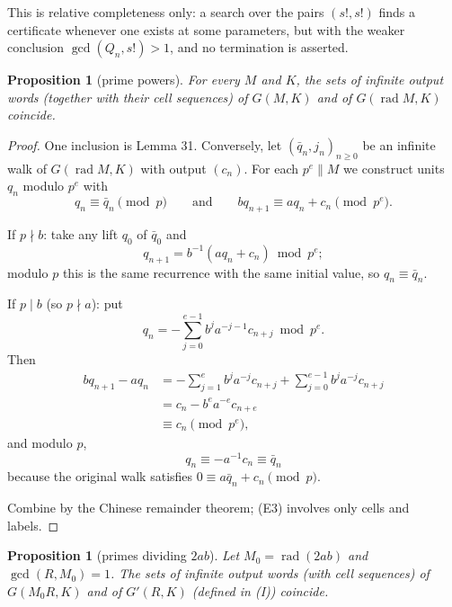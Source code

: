 \documentclass[11pt,reqno]{amsart}
\newtheorem{proposition}[theorem]{Proposition}
\theoremstyle{definition}
\theoremstyle{remark}
\begin{document}
This is relative completeness only: a search over the pairs \((s!,s!)\)
finds a certificate whenever one exists at some parameters, but with the
weaker conclusion \(\gcd(Q_n,s!)>1\), and no termination is asserted.

\begin{samepage}
\begin{proposition}[prime powers]\leavevmode\label{thm:35}
For every \(M\) and \(K\), the sets
of infinite output words (together with their cell sequences) of
\(G(M,K)\) and of \(G(\operatorname{rad}M,K)\) coincide.
\label{thm-end:35}
\end{proposition}
\end{samepage}

\begin{proof}\leavevmode\label{proof:35}
One inclusion is Lemma 31. Conversely, let
\((\bar q_n,j_n)_{n\ge0}\) be an infinite walk of
\(G(\operatorname{rad}M,K)\) with output \((c_n)\). For each
\(p^e\parallel M\) we construct units \(q_n\) modulo \(p^e\) with
\[
q_n\equiv\bar q_n\pmod p\qquad \text{and}\qquad bq_{n+1}\equiv aq_n+c_n\pmod{p^e}.
\]

If \(p\nmid b\): take any lift \(q_0\) of \(\bar q_0\) and
\[
q_{n+1}=b^{-1}(aq_n+c_n)\bmod p^e;
\]
modulo \(p\) this is the same
recurrence with the same initial value, so \(q_n\equiv\bar q_n\).

If
\(p\mid b\) (so \(p\nmid a\)): put
\[
q_n=-\sum_{j=0}^{e-1}b^ja^{-j-1}c_{n+j}\bmod p^e.
\]
Then
\[
\begin{aligned}
bq_{n+1}-aq_n&=-\sum_{j=1}^{e}b^ja^{-j}c_{n+j}+\sum_{j=0}^{e-1}b^ja^{-j}c_{n+j}\\
&=c_n-b^ea^{-e}c_{n+e}\\
&\equiv c_n\pmod{p^e},
\end{aligned}
\]
and modulo \(p\),
\[
q_n\equiv-a^{-1}c_n\equiv\bar q_n
\]
because the original walk satisfies
\(0\equiv a\bar q_n+c_n\pmod p\).

Combine by the Chinese remainder
theorem; (E3) involves only cells and labels. \qedhere
\end{proof}

\begin{samepage}
\begin{proposition}[primes dividing \(2ab\)]\leavevmode\label{thm:36}
Let
\(M_0=\operatorname{rad}(2ab)\) and \(\gcd(R,M_0)=1\). The sets of
infinite output words (with cell sequences) of \(G(M_0R,K)\) and of
\(G'(R,K)\) (defined in (I)) coincide.
\label{thm-end:36}
\end{proposition}
\end{samepage}
\end{document}
